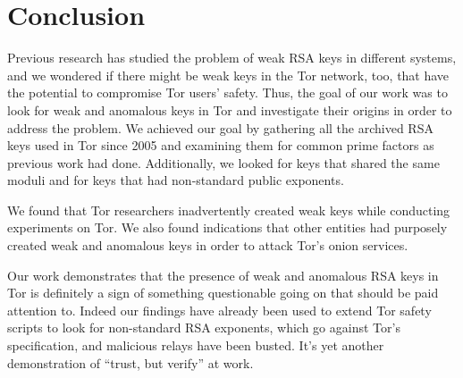 \section{Conclusion}
\label{sec:conclusion}

Previous research has studied the problem of weak RSA keys in different 
systems, and we wondered if there might be weak keys in the Tor 
network, too, that have the potential to compromise Tor users' safety.  
Thus, the goal of our work was to look for weak and anomalous keys in Tor 
and investigate their origins in order to address the problem.  We 
achieved our goal by gathering all the archived RSA keys used in Tor since 
2005 and examining them for common prime factors as previous work had done.  
Additionally, we looked for keys that shared the same moduli and 
for keys that had non-standard public exponents.

We found that Tor researchers inadvertently created weak keys while 
conducting experiments on Tor.  We also found indications that other 
entities had purposely created weak and anomalous keys in order to 
attack Tor's onion services.  

Our work demonstrates that the presence of weak and anomalous RSA keys in 
Tor is definitely a sign of something questionable going on that should 
be paid attention to.  Indeed our findings have already been used to 
extend Tor safety scripts to look for non-standard RSA exponents, 
which go against Tor's specification, and malicious relays have been busted.  
It's yet another demonstration of ``trust, but verify'' at work.
